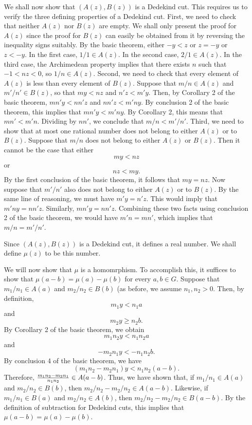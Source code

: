 \documentclass[12pt]{article}
\begin{document}
We shall now show that $(A(z),B(z))$ is a Dedekind cut.  This requires us to verify the three defining properties of a Dedekind cut.  First, we need to check that neither $A(z)$ nor $B(z)$ are empty.  We shall only present the proof for $A(z)$ since the proof for $B(z)$ can easily be obtained from it by reversing the inequality signs suitably.  By the basic theorem, either $-y < z$ or $z = -y$ or $z < -y$.  In the first case, $1/1 \in A(z)$.  In the second case, $2/1 \in A(z)$.  In the third case, the Archimedean property implies that there exists $n$ such that $-1 < nz < 0$, so $1/n \in A(z)$.  Second, we need to check that every element of $A(z)$ is less than every element of $B(z)$.  Suppose that $m/n \in A(z)$ and $m'/n' \in B(z)$, so that $my < nz$ and $n'z < m'y$.  Then, by Corollary 2 of the basic theorem, $mn'y < nn'z$ and $nn'z < m'ny$.  By conclusion 2 of the basic theorem, this implies that $mn'y < m'ny$.  By Corollary 2, this means that $mn' < m'n$.  Dividing by $nn'$, we conclude that $m/n < m'/n'$.  Third, we need to show that at most one rational number does not belong to either $A(z)$ or to $B(z)$.  Suppose that $m/n$ does not belong to either $A(z)$ or $B(z)$.  Then it cannot be the case that either
 $$my < nz$$
or
 $$nz < my.$$
By the first conclusion of the basic theorem, it follows that $my = nz$.   Now suppose that $m'/n'$ also does not belong to either $A(z)$ or to $B(z)$.  By the same line of reasoning, we must have $m'y = n'z$.  This would imply that $m'n y = nn' z$.  Similarly, $mn' y = nn' z$.  Combining these two facts using conclusion 2 of the basic theorem, we would have $m'n = mn'$, which implies that $m/n = m'/n'$.

Since $(A(z), B(z))$ is a Dedekind cut, it defines a real number.  We shall define $\mu (z)$ to be this number.

We will now show that $\mu$ is a homomrphism.  To accomplish this, it suffices to show that $\mu (a-b) = \mu (a) - \mu (b)$ for every $a, b \in G$.  Suppose that $m_1 / n_1 \in A(a)$ and $m_2 / n_2 \in B(b)$ (as before, we assume $n_1, n_2 > 0$.  Then, by definition, 
 $$m_1 y <  n_1 a$$
and 
 $$m_2 y \ge n_2 b.$$
By Corollary 2 of the basic theorem, we obtain
 $$m_1 n_2 y <  n_1 n_2 a$$
and 
 $$- m_2 n_1 y < - n_1 n_2 b.$$
By conclusion 4 of the basic theorem, we have
 $$(m_1 n_2 - m_2 n_1) y < n_1 n_2 (a - b).$$
Therefore, ${m_1 n_2 - m_2 n_1 \over n_1 n_2} \in A (a-b)$.  Thus, we have shown that, if $m_1 / n_1 \in A(a)$ and $m_2 / n_2 \in B(b)$, then $m_2 / n_2 -m_2 / n_2 \in A(a-b)$.  Likewise, if $m_1 / n_1 \in B(a)$ and $m_2 / n_2 \in A(b)$, then $m_2 / n_2 - m_2 / n_2 \in B(a-b)$.  By the definition of subtraction for Dedekind cuts, this implies that $\mu (a - b) = \mu (a) - \mu (b)$.
\end{document}
